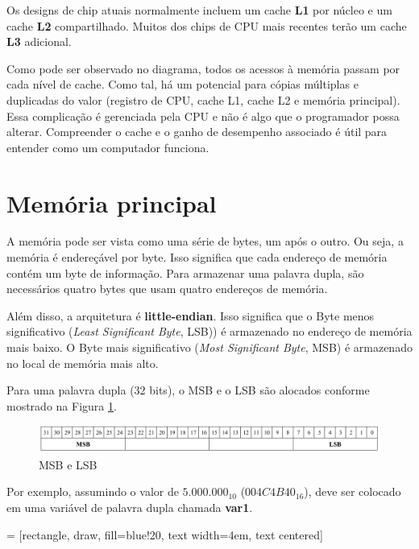 Os designs de chip atuais normalmente incluem um cache \textbf{L1} por núcleo e um cache \textbf{L2} compartilhado. Muitos dos chips de CPU mais recentes terão um cache \textbf{L3} adicional.

Como pode ser observado no diagrama, todos os acessos à memória passam por cada nível de cache. Como tal, há um potencial para cópias múltiplas e duplicadas do valor (registro de CPU, cache L1, cache L2 e memória principal). Essa complicação é gerenciada pela CPU e não é algo que o programador possa alterar. Compreender o cache e o ganho de desempenho associado é útil para entender como um computador funciona.

\section{Memória principal}
A memória pode ser vista como uma série de bytes, um após o outro. Ou seja, a memória é endereçável por byte. Isso significa que cada endereço de memória contém um byte de informação. Para armazenar uma palavra dupla, são necessários quatro bytes que usam quatro endereços de memória.

Além disso, a arquitetura é \textbf{little-endian}. Isso significa que o Byte menos significativo (\textit{Least Significant Byte}, LSB)) é armazenado no endereço de memória mais baixo. O Byte mais significativo (\textit{Most Significant Byte}, MSB) é armazenado no local de memória mais alto.

Para uma palavra dupla (32 bits), o MSB e o LSB são alocados conforme mostrado na Figura \ref{fig:msb}.
\begin{figure}[ht]
	\begin{center}
		\includegraphics[width=\linewidth]{imagens/msb}
	\end{center}
	\caption{MSB e LSB}
	\label{fig:msb}
\end{figure}

Por exemplo, assumindo o valor de $ 5.000.000_{10} $ ($ 004C4B40_{16} $), deve ser colocado em uma variável de palavra dupla chamada \textbf{var1}.

 = [rectangle, draw, fill=blue!20, 
text width=4em, text centered]

